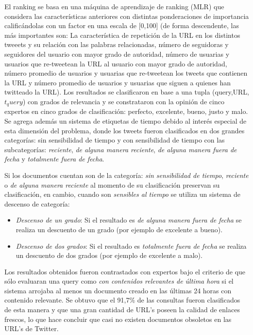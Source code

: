	El ranking se basa en una máquina de aprendizaje de ranking (MLR) que considera las características anteriores con distintas ponderaciones de importancia calificándolas con un factor en una escala de [0,100] (de forma descendente, las más importantes son: La característica de repetición de la URL en los distintos tweeets y su relación con las palabras relacionadas, número de seguidoras y seguidores del usuario con mayor grado de autoridad, número de usuarias y usuarios que re-tweetean la URL al usuario con mayor grado de autoridad, número promedio de usuarios y usuarias que re-tweetean los tweets que contienen la URL y número promedio de usuarios y usuarias que siguen a quienes han twitteado la URL). Los resultados se clasificaron en base a una tupla (query,URL,$t_query$) con grados de relevancia y se constrataron con la opinión de cinco expertos en cinco grados de clasificación: perfecto, excelente, bueno, justo y malo. Se agrega además un sistema de etiquetas de tiempo debido al interés especial de esta dimensión del problema, donde los tweets fueron clasificados en dos grandes categorías: sin sensibilidad de tiempo y con sensibilidad de tiempo con las subcategorías: \emph{reciente}, \emph{de alguna manera reciente}, \emph{de alguna manera fuera de fecha} y \emph{totalmente fuera de fecha}.
	
	Si los documentos cuentan son de la categoría: \emph{sin sensibilidad de tiempo}, \emph{reciente} o \emph{de alguna manera reciente} al momento de su clasificación preservan su clasificación, en cambio, cuando son \emph{sensibles al tiempo} se utiliza un sistema de descenso de categoría:
	
	\begin{itemize}
		\item \emph{Descenso de un grado}: Si el resultado es \emph{de alguna manera fuera de fecha} se realiza un descuento de un grado (por ejemplo de excelente a bueno).
		\item \emph{Descenso de dos grados}: Si el resultado es \emph{totalmente fuera de fecha} se realiza un descuento de dos grados (por ejemplo de excelente a malo).
	\end{itemize}
	
	Los resultados obtenidos fueron contrastados con expertos bajo el criterio de que sólo evaluaran una query como \emph{con contenidos relevantes de última hora} si el sistema arrojaba al menos un documento creado en las últimas 24 horas con contenido relevante. Se obtuvo que el 91,7\% de las consultas fueron clasificados de esta manera y que una gran cantidad de URL's poseen la calidad de enlaces frescos, lo que hace concluir que casi no existen documentos obsoletos en las URL's de Twitter. 
	
